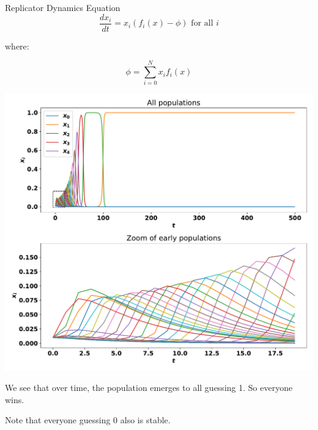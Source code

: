 \documentclass{beamer}              %
\begin{document}
\begin{frame}
    \begin{definition}{Replicator Dynamics Equation}
        \[\frac{dx_i}{dt}=x_i(f_i(x) - \phi)\text{ for all }i\]

        where: 

        \[\phi=\sum_{i=0}^Nx_if_i(x)\]
    \end{definition}
\end{frame}


\begin{frame}
    \begin{center}
        \includegraphics[width=.8\textwidth]{./static/two_thirds_of_the_average_game/numerical_solution_of_replicator_dynamics/main.pdf}
    \end{center}
\end{frame}

\begin{frame}
    We see that over time, the population emerges to all guessing 1. So everyone
    wins.

     Note that everyone guessing 0 also is stable. 
\end{frame}
\end{document}
